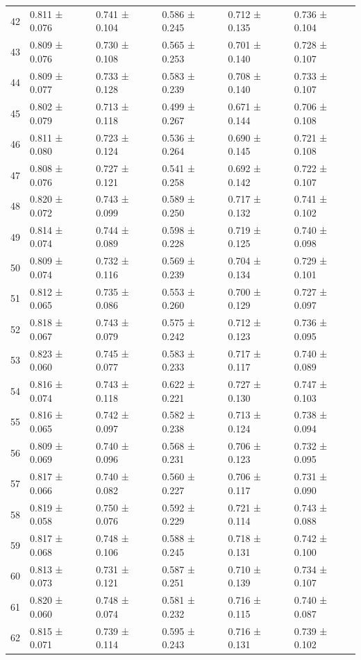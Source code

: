 \begin{tabular}{llllll}
42 & 0.811 ± 0.076 & 0.741 ± 0.104 & 0.586 ± 0.245 & 0.712 ± 0.135 & 0.736 ± 0.104 \\
43 & 0.809 ± 0.076 & 0.730 ± 0.108 & 0.565 ± 0.253 & 0.701 ± 0.140 & 0.728 ± 0.107 \\
44 & 0.809 ± 0.077 & 0.733 ± 0.128 & 0.583 ± 0.239 & 0.708 ± 0.140 & 0.733 ± 0.107 \\
45 & 0.802 ± 0.079 & 0.713 ± 0.118 & 0.499 ± 0.267 & 0.671 ± 0.144 & 0.706 ± 0.108 \\
46 & 0.811 ± 0.080 & 0.723 ± 0.124 & 0.536 ± 0.264 & 0.690 ± 0.145 & 0.721 ± 0.108 \\
47 & 0.808 ± 0.076 & 0.727 ± 0.121 & 0.541 ± 0.258 & 0.692 ± 0.142 & 0.722 ± 0.107 \\
48 & 0.820 ± 0.072 & 0.743 ± 0.099 & 0.589 ± 0.250 & 0.717 ± 0.132 & 0.741 ± 0.102 \\
49 & 0.814 ± 0.074 & 0.744 ± 0.089 & 0.598 ± 0.228 & 0.719 ± 0.125 & 0.740 ± 0.098 \\
50 & 0.809 ± 0.074 & 0.732 ± 0.116 & 0.569 ± 0.239 & 0.704 ± 0.134 & 0.729 ± 0.101 \\
51 & 0.812 ± 0.065 & 0.735 ± 0.086 & 0.553 ± 0.260 & 0.700 ± 0.129 & 0.727 ± 0.097 \\
52 & 0.818 ± 0.067 & 0.743 ± 0.079 & 0.575 ± 0.242 & 0.712 ± 0.123 & 0.736 ± 0.095 \\
53 & 0.823 ± 0.060 & 0.745 ± 0.077 & 0.583 ± 0.233 & 0.717 ± 0.117 & 0.740 ± 0.089 \\
54 & 0.816 ± 0.074 & 0.743 ± 0.118 & 0.622 ± 0.221 & 0.727 ± 0.130 & 0.747 ± 0.103 \\
55 & 0.816 ± 0.065 & 0.742 ± 0.097 & 0.582 ± 0.238 & 0.713 ± 0.124 & 0.738 ± 0.094 \\
56 & 0.809 ± 0.069 & 0.740 ± 0.096 & 0.568 ± 0.231 & 0.706 ± 0.123 & 0.732 ± 0.095 \\
57 & 0.817 ± 0.066 & 0.740 ± 0.082 & 0.560 ± 0.227 & 0.706 ± 0.117 & 0.731 ± 0.090 \\
58 & 0.819 ± 0.058 & 0.750 ± 0.076 & 0.592 ± 0.229 & 0.721 ± 0.114 & 0.743 ± 0.088 \\
59 & 0.817 ± 0.068 & 0.748 ± 0.106 & 0.588 ± 0.245 & 0.718 ± 0.131 & 0.742 ± 0.100 \\
60 & 0.813 ± 0.073 & 0.731 ± 0.121 & 0.587 ± 0.251 & 0.710 ± 0.139 & 0.734 ± 0.107 \\
61 & 0.820 ± 0.060 & 0.748 ± 0.074 & 0.581 ± 0.232 & 0.716 ± 0.115 & 0.740 ± 0.087 \\
62 & 0.815 ± 0.071 & 0.739 ± 0.114 & 0.595 ± 0.243 & 0.716 ± 0.131 & 0.739 ± 0.102 \\

\end{tabular}
